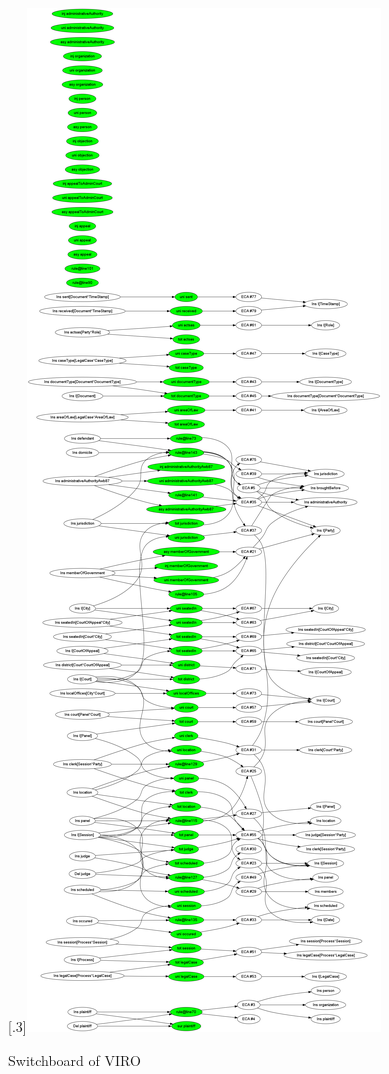 \documentclass[10pt,a4paper]{report}              %
\theoremstyle{plain}\theorembodyfont{\rmfamily}\newtheorem{definition}{Definition}[section]
\theoremstyle{plain}\theorembodyfont{\rmfamily}\newtheorem{designrule}[definition]{Requirement}
\begin{document}
\begin{figure}[htb]
\begin{center}
\scalebox{.3}[.3]{\includegraphics{SBVIRO}}
\caption{Switchboard of VIRO}
\label{fig:SBVIRO}
\end{center}
\end{figure}
\end{document}
